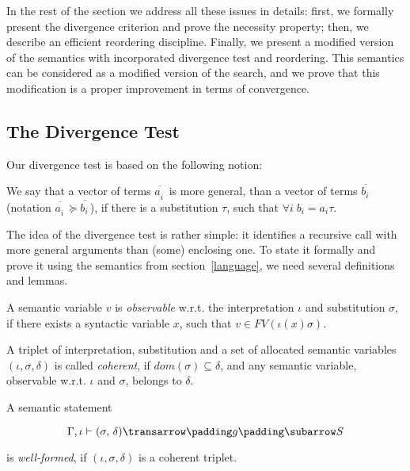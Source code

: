 In the rest of the section we address all these issues in details: first, we formally present the divergence
criterion and prove the necessity property; then, we describe an efficient reordering discipline. Finally, we present a
modified version of the semantics with incorporated divergence test and reordering. This semantics can be
considered as a modified version of the search, and we prove that this modification is a proper improvement in terms
of convergence.

\subsection{The Divergence Test}

Our divergence test is based on the following notion:

\begin{definition}
\normalfont 
We say that a vector of terms $\overline{a^{\phantom{x}}_i}$ is more general, than a vector of terms $\overline{b^{\phantom{x}}_i}$ (notation 
$\overline{a^{\phantom{x}}_i}\succeq\overline{b^{\phantom{x}}_i}$), if there is a substitution $\tau$, such that $\forall i\;b_i = a_i \tau$.
\end{definition}

The idea of the divergence test is rather simple: it identifies a recursive call with more general arguments 
than (some) enclosing one. To state it formally and prove it using the semantics from section~\ref{language}, we need several definitions and lemmas.

\begin{definition}
\normalfont
A semantic variable $v$ is \emph{observable} w.r.t. the interpretation $\iota$ and substitution $\sigma$, if there exists 
a syntactic variable $x$, such that \mbox{$v \in FV(\iota(x) \sigma)$}.
\end{definition}

\begin{definition}
A triplet of interpretation, substitution and a set of allocated semantic variables \mbox{$(\iota,\sigma,\delta)$} is
called \emph{coherent}, if \mbox{$dom(\sigma) \subseteq \delta$}, and any semantic variable, observable w.r.t. $\iota$ and $\sigma$,
belongs to $\delta$.  
\end{definition}

\begin{definition}
\normalfont
A semantic statement 

$$
\otrans{\Gamma,\iota}{(\sigma,\,\delta)}{g}{S}
$$ 

\noindent is \emph{well-formed}, if \mbox{$(\iota,\sigma,\delta)$} is a coherent triplet.
\end{definition}

